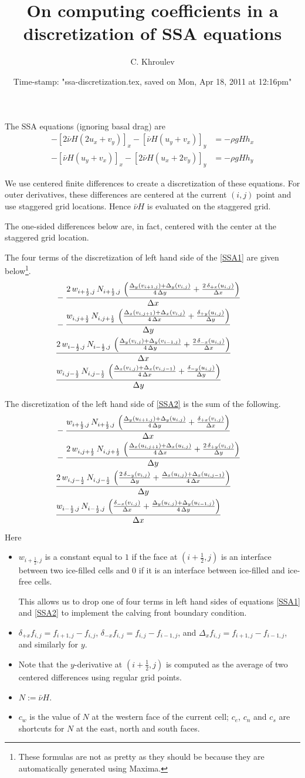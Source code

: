 \documentclass{amsart}
\date{Time-stamp: "ssa-discretization.tex, saved on Mon, Apr 18, 2011 at 12:16pm"}
\begin{document}
\title{On computing coefficients in a discretization of SSA equations}
\author{C. Khroulev}
\maketitle

The SSA equations (ignoring basal drag) are
\begin{align}
-\left[ 2\bar\nu H\left( 2u_{x} + v_{y}\right)\right]_{x} - \left[\bar\nu
  H\left(u_{y}+v_{x} \right) \right]_{y} &= - \rho gH h_{x} \label{SSA1} \\
-\left[ \bar\nu H\left( u_{y} + v_{x} \right)\right]_{x} - \left[2\bar\nu
  H\left(u_{x}+2v_{y}  \right) \right]_{y} &= -\rho gH h_{y} \label{SSA2}
\end{align}

We use centered finite differences to create a discretization of these
equations. For outer derivatives, these differences are centered at the current
$(i,j)$ point and use staggered grid locations. Hence $\bar \nu H$ is evaluated on the staggered grid.

The one-sided differences below are, in fact, centered with the center at the
staggered grid location.

\medskip
The four terms of the discretization of left hand side of the \eqref{SSA1} are
given below\footnote{These formulas are not as pretty as they should be because
they are automatically generated using Maxima.}.
\begin{eqnarray*}
  \lhsI
\end{eqnarray*}

The discretization of the left hand side of \eqref{SSA2} is the sum of the following.
\begin{eqnarray*}
  \lhsII
\end{eqnarray*}

Here
\begin{itemize}
\item $w_{i+\frac12,j}$ is a constant equal to $1$ if the face at $(i+\frac12,j)$ is
  an interface between two ice-filled cells and $0$ if it is an interface
  between ice-filled and ice-free cells.

  This allows us to drop one of four terms in left hand sides of equations
  \eqref{SSA1} and \eqref{SSA2} to implement the calving front boundary
  condition.

\item $\delta_{+x}f_{i,j} = f_{i+1,j}-f_{i,j}$, $\delta_{-x}f_{i,j} =
  f_{i,j}-f_{i-1,j}$, and $\Delta_{x}f_{i,j} = f_{i+1,j}-f_{i-1,j}$, and
  similarly for $y$.
\item Note that the $y$-derivative at $(i+\frac12,j)$ is computed as the
  average of two centered differences using regular grid points.
\item $N := \bar \nu H$.
\item $c_{w}$ is the value of $N$ at the western face of the current cell;
  $c_{e}$, $c_{n}$ and $c_{s}$ are shortcuts for $N$ at the east, north and
  south faces.
\end{itemize}
\end{document}

